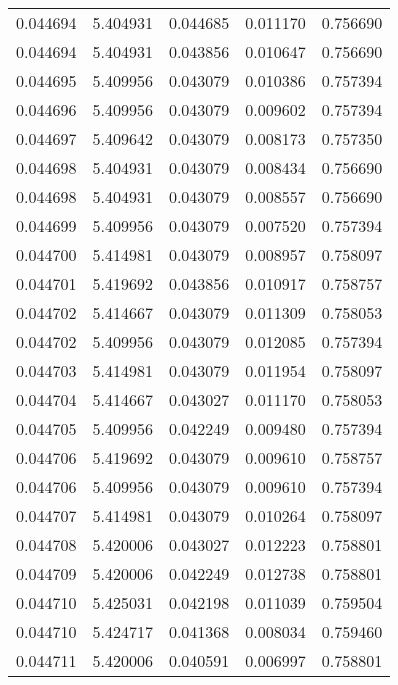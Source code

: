 \begin{tabular}{lrrrr}
0.044694    &  5.404931 &  0.044685 &  0.011170 &             0.756690 \\
0.044694    &  5.404931 &  0.043856 &  0.010647 &             0.756690 \\
0.044695    &  5.409956 &  0.043079 &  0.010386 &             0.757394 \\
0.044696    &  5.409956 &  0.043079 &  0.009602 &             0.757394 \\
0.044697    &  5.409642 &  0.043079 &  0.008173 &             0.757350 \\
0.044698    &  5.404931 &  0.043079 &  0.008434 &             0.756690 \\
0.044698    &  5.404931 &  0.043079 &  0.008557 &             0.756690 \\
0.044699    &  5.409956 &  0.043079 &  0.007520 &             0.757394 \\
0.044700    &  5.414981 &  0.043079 &  0.008957 &             0.758097 \\
0.044701    &  5.419692 &  0.043856 &  0.010917 &             0.758757 \\
0.044702    &  5.414667 &  0.043079 &  0.011309 &             0.758053 \\
0.044702    &  5.409956 &  0.043079 &  0.012085 &             0.757394 \\
0.044703    &  5.414981 &  0.043079 &  0.011954 &             0.758097 \\
0.044704    &  5.414667 &  0.043027 &  0.011170 &             0.758053 \\
0.044705    &  5.409956 &  0.042249 &  0.009480 &             0.757394 \\
0.044706    &  5.419692 &  0.043079 &  0.009610 &             0.758757 \\
0.044706    &  5.409956 &  0.043079 &  0.009610 &             0.757394 \\
0.044707    &  5.414981 &  0.043079 &  0.010264 &             0.758097 \\
0.044708    &  5.420006 &  0.043027 &  0.012223 &             0.758801 \\
0.044709    &  5.420006 &  0.042249 &  0.012738 &             0.758801 \\
0.044710    &  5.425031 &  0.042198 &  0.011039 &             0.759504 \\
0.044710    &  5.424717 &  0.041368 &  0.008034 &             0.759460 \\
0.044711    &  5.420006 &  0.040591 &  0.006997 &             0.758801 \\

\end{tabular}
